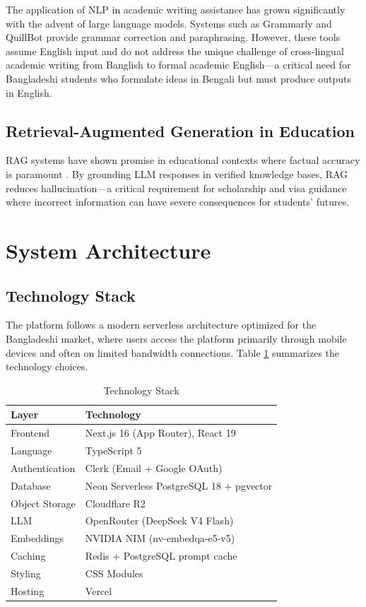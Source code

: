 \documentclass[conference]{IEEEtran}
\begin{document}
The application of NLP in academic writing assistance has grown significantly with the advent of large language models. Systems such as Grammarly and QuillBot provide grammar correction and paraphrasing. However, these tools assume English input and do not address the unique challenge of cross-lingual academic writing from Banglish to formal academic English—a critical need for Bangladeshi students who formulate ideas in Bengali but must produce outputs in English.

\subsection{Retrieval-Augmented Generation in Education}

RAG systems have shown promise in educational contexts where factual accuracy is paramount \cite{lewis2020rag}. By grounding LLM responses in verified knowledge bases, RAG reduces hallucination—a critical requirement for scholarship and visa guidance where incorrect information can have severe consequences for students' futures.

\section{System Architecture}
\label{sec:architecture}

\subsection{Technology Stack}

The platform follows a modern serverless architecture optimized for the Bangladeshi market, where users access the platform primarily through mobile devices and often on limited bandwidth connections. Table \ref{tab:stack} summarizes the technology choices.

\begin{table}[h]
\centering
\caption{Technology Stack}
\label{tab:stack}
\begin{tabular}{ll}
\toprule
\textbf{Layer} & \textbf{Technology} \\
\midrule
Frontend & Next.js 16 (App Router), React 19 \\
Language & TypeScript 5 \\
Authentication & Clerk (Email + Google OAuth) \\
Database & Neon Serverless PostgreSQL 18 + pgvector \\
Object Storage & Cloudflare R2 \\
LLM & OpenRouter (DeepSeek V4 Flash) \\
Embeddings & NVIDIA NIM (nv-embedqa-e5-v5) \\
Caching & Redis + PostgreSQL prompt cache \\
Styling & CSS Modules \\
Hosting & Vercel \\
\bottomrule
\end{tabular}
\end{table}
\end{document}
